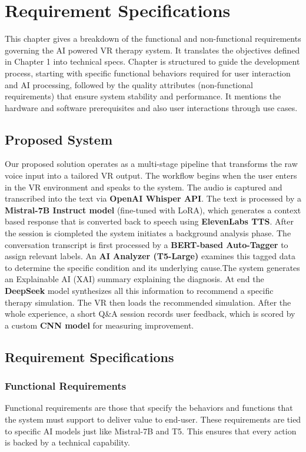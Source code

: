\chapter{Requirement Specifications} 
\label{chap:reqs}


This chapter gives a breakdown of the functional and non-functional requirements governing the AI powered VR therapy system. It translates the objectives defined in Chapter 1 into technical specs. Chapter is structured to guide the development process, starting with specific functional behaviors required for user interaction and AI processing, followed by the quality attributes (non-functional requirements) that ensure system stability and performance. It mentions the hardware and software prerequisites and also user interactions through use cases.

\section{Proposed System}
Our proposed solution operates as a multi-stage pipeline that transforms the raw voice input into a tailored VR output. The workflow begins when the user enters in the VR environment and speaks to the system. The audio is captured and transcribed into the text via \textbf{OpenAI Whisper API}. The text is processed by a \textbf{Mistral-7B Instruct model} (fine-tuned with LoRA), which generates a context based response that is converted back to speech using \textbf{ElevenLabs TTS}. After the session is ciompleted the system initiates a background analysis phase. The conversation transcript is first processed by a \textbf{BERT-based Auto-Tagger} to assign relevant labels. An \textbf{AI Analyzer (T5-Large)} examines this tagged data to determine the specific condition and its underlying cause.The system generates an Explainable AI (XAI) summary explaining the diagnosis. At end the \textbf{DeepSeek} model synthesizes all this information to recommend a specific therapy simulation. The VR then loads the recommended simulation. After the whole experience, a short Q\&A session records user feedback, which is scored by a custom \textbf{CNN model} for measuring improvement.

\section{Requirement Specifications}

\subsection{Functional Requirements}
Functional requirements are those that specify the behaviors and functions that the system must support to deliver value to end-user. These requirements are tied to specific AI models just like Mistral-7B and T5. This ensures that every action is backed by a technical capability.
